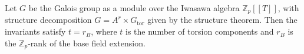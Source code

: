 Let $G$ be the Galois group as a module over the Iwasawa algebra $\mathbb{Z}_p[[T]]$, with structure decomposition $G = A^r \times G_{\text{tor}}$ given by the structure theorem. Then the invariants satisfy $t = r_B$, where $t$ is the number of torsion components and $r_B$ is the $\mathbb{Z}_p$-rank of the base field extension.
